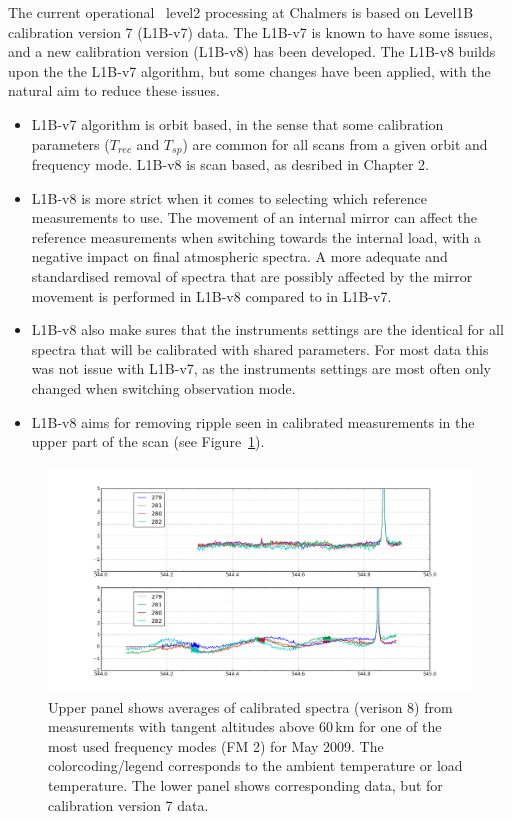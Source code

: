 The current operational \smr\ level2 processing at Chalmers is based on 
Level1B calibration version 7 (L1B-v7) data. 
The L1B-v7 is known to have some issues, and a new calibration version
(L1B-v8) has been developed. The L1B-v8 builds upon the the L1B-v7 algorithm,
but some changes have been applied, with the natural aim to reduce these issues.  

\begin{itemize}

\item L1B-v7 algorithm is orbit based, in the sense that some calibration parameters (\(T_{rec}\)
and \(T_{sp}\)) are common for all scans from a given orbit and frequency mode.
L1B-v8 is scan based, as desribed in Chapter 2.
 
\item L1B-v8 is more strict when it comes to selecting which reference measurements to use.
The movement of an internal mirror can affect the reference measurements when switching
towards the internal load, with a negative impact on final atmospheric
spectra. A more adequate and standardised removal of spectra that are possibly 
affected by the mirror movement is performed in L1B-v8 compared to in L1B-v7. 

\item L1B-v8 also make sures that the instruments settings are the identical
for all spectra that will be calibrated with shared parameters. For most data
this was not issue with L1B-v7, as the instruments settings are most often
only changed when switching observation mode.   


\item L1B-v8 aims for removing ripple seen in calibrated measurements in the
upper part of the scan (see Figure~\ref{fig:ripple}).

\end{itemize}


\begin{figure}
\includegraphics[width=14cm]{ripple_v7and8_FM2_may2009.png}
\caption{Upper panel shows averages of calibrated spectra (verison 8) from measurements
with tangent altitudes above 60\,km for one of the most used frequency modes (FM 2) for May 2009.
The colorcoding/legend corresponds to the ambient temperature or load temperature.
The lower panel shows corresponding data, but for calibration version 7 data.
 }
\label{fig:ripple}
\end{figure}




